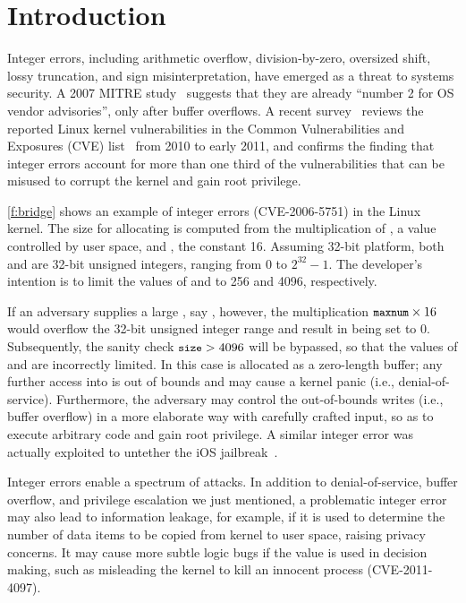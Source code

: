 \section{Introduction}
\label{s:intro}

Integer errors, including arithmetic overflow, division-by-zero,
oversized shift, lossy truncation, and sign misinterpretation, have
emerged as a threat to systems security.  A 2007 MITRE
study~\cite{christey:vuln} suggests that they are already ``number
2 for OS vendor advisories'', only after buffer overflows.  A recent
survey~\cite{chen:kbugs} reviews the reported Linux kernel
vulnerabilities in the Common Vulnerabilities and Exposures (CVE)
list~\cite{cve} from 2010 to early 2011, and confirms the finding
that integer errors account for more than one third of the
vulnerabilities that can be misused to corrupt the kernel and gain
root privilege.

\autoref{f:bridge} shows an example of integer errors (CVE-2006-5751)
in the Linux kernel.  The size for allocating  is computed
from the multiplication of , a value controlled by user
space, and , the constant 16.  Assuming
32-bit platform, both  and  are 32-bit unsigned
integers, ranging from 0 to $2^{32} - 1$.  The developer's intention
is to limit the values of  and  to 256 and 4096,
respectively.

If an adversary supplies a large , say
, however, the multiplication $\cc{maxnum} \times 16$ would
overflow the 32-bit unsigned integer range and result in 
being set to 0.  Subsequently, the sanity check $\cc{size} > 4096$
will be bypassed, so that the values of  and 
are incorrectly limited.  In this case  is allocated as
a zero-length buffer; any further access into  is out of
bounds and may cause a kernel panic (i.e., denial-of-service).
Furthermore, the adversary may control the out-of-bounds writes
(i.e., buffer overflow) in a more elaborate way with carefully
crafted input, so as to execute arbitrary code and gain root
privilege.  A similar integer error was actually exploited to
untether the iOS jailbreak~\cite{esser:ios}.

Integer errors enable a spectrum of attacks.  In addition to
denial-of-service, buffer overflow, and privilege escalation we
just mentioned, a problematic integer error may also lead to information
leakage, for example, if it is used to determine the number of data
items to be copied from kernel to user space, raising privacy
concerns.  It may cause more subtle logic bugs if the value is used
in decision making, such as misleading the kernel to kill an innocent
process (CVE-2011-4097).

